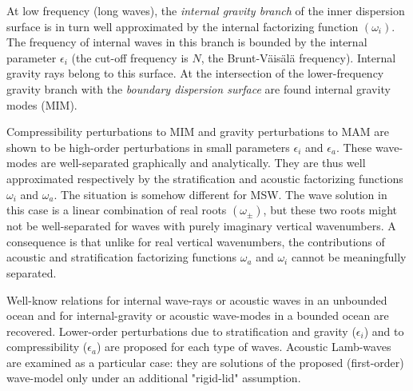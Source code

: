 At low frequency (long waves), the \textit{internal gravity branch} of the inner dispersion surface is in turn well approximated by the internal factorizing function $(\omega_i)$. The frequency of internal waves in this branch is bounded by the internal parameter $\epsilon_i$ (the cut-off frequency is $N$, the Brunt-Väisälä frequency). Internal gravity rays belong to this surface. At the intersection of the lower-frequency gravity branch with the \textit{boundary dispersion surface} are found internal gravity modes (MIM).

Compressibility perturbations to MIM and gravity perturbations to MAM are shown to be high-order perturbations in small parameters $\epsilon_i$ and $\epsilon_a$. These wave-modes are well-separated graphically and analytically. They are thus well approximated respectively by the stratification and acoustic factorizing functions $\omega_i$ and $\omega_a$. The situation is somehow different for MSW. The wave solution in this case is a linear combination of real roots $(\omega_\pm)$, but these two roots might not be well-separated for waves with purely imaginary vertical wavenumbers. A consequence is that unlike for real vertical wavenumbers, the contributions of acoustic and stratification factorizing functions $\omega_a$ and $\omega_i$ cannot be meaningfully separated.

Well-know relations for internal wave-rays or acoustic waves in an unbounded ocean and for internal-gravity or acoustic wave-modes in a bounded ocean are recovered. Lower-order perturbations due to stratification and gravity ($\epsilon_i$) and to compressibility ($\epsilon_a$) are proposed for each type of waves. Acoustic Lamb-waves are examined as a particular case: they are solutions of the proposed (first-order) wave-model only under an additional "rigid-lid" assumption.\\

